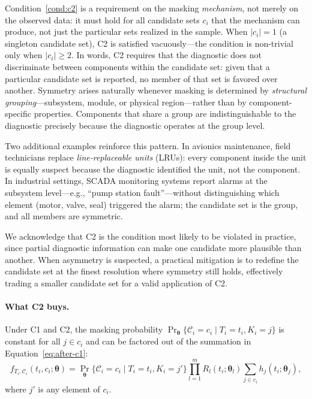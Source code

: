 \documentclass[11pt]{article}
\theoremstyle{definition}
\theoremstyle{plain}
\renewcommand{\v}[1]{\boldsymbol{#1}}
\newcommand{\btheta}{\v{\theta}}
\begin{document}
Condition~\ref{cond:c2} is a requirement on the masking \emph{mechanism},
not merely on the observed data: it must hold for all candidate sets
$c_i$ that the mechanism can produce, not just the particular sets
realized in the sample.
When $|c_i| = 1$ (a singleton candidate set), C2 is satisfied
vacuously---the condition is non-trivial only when $|c_i| \geq 2$.
In words, C2 requires that the diagnostic does not
discriminate between components within the candidate set: given that a
particular candidate set is reported, no member of that set is favored
over another.
Symmetry arises naturally whenever masking is determined by
\emph{structural grouping}---subsystem, module, or physical
region---rather than by component-specific properties.
Components that share a group are indistinguishable to the diagnostic
precisely because the diagnostic operates at the group level.

Two additional examples reinforce this pattern.
In avionics maintenance, field technicians replace
\emph{line-replaceable units} (LRUs): every component inside the unit is
equally suspect because the diagnostic identified the unit, not the
component.
In industrial settings, SCADA monitoring systems report alarms at the
subsystem level---e.g., ``pump station fault''---without distinguishing
which element (motor, valve, seal) triggered the alarm; the candidate
set is the group, and all members are symmetric.

We acknowledge that C2 is the condition most likely to be violated in
practice, since partial diagnostic information can make one candidate
more plausible than another.
When asymmetry is suspected, a practical mitigation is to redefine
the candidate set at the finest resolution where symmetry still holds,
effectively trading a smaller candidate set for a valid application of
C2.

\paragraph{What C2 buys.}
Under C1 and C2, the masking probability
$\Pr_{\!\btheta}\{\mathcal{C}_i = c_i \mid T_i = t_i, K_i = j\}$
is constant for all $j \in c_i$ and can be factored out of the summation
in Equation~\eqref{eq:after-c1}:
\begin{equation}
\label{eq:after-c2}
    f_{T_i, \mathcal{C}_i}(t_i, c_i; \btheta)
    = \Pr_{\!\btheta}\{\mathcal{C}_i = c_i \mid T_i = t_i, K_i = j'\}
        \prod_{l=1}^m R_l(t_i; \v{\theta}_l)
        \sum_{j \in c_i} h_j(t_i; \v{\theta}_j),
\end{equation}
where $j'$ is any element of $c_i$.
\end{document}
